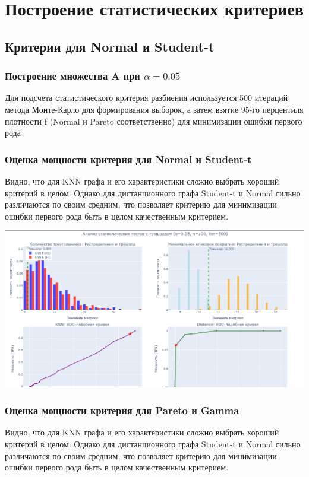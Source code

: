 \documentclass[a4paper,12pt]{report}
\begin{document}
\chapter{Построение статистических критериев}

\section{Критерии для Normal и Student-t}

\subsection{Построение множества A при $\alpha = 0.05$}

Для подсчета статистического критерия разбиения используется 500 итераций метода Монте-Карло для формирования выборок, а затем взятие 95-го перцентиля плотности f (Normal и Pareto соответственно) для минимизации ошибки первого рода

\subsection{Оценка мощности критерия для Normal и Student-t}

Видно, что для KNN графа и его характеристики сложно выбрать хороший критерий в целом. Однако для дистанционного графа Student-t и Normal сильно различаются по своим средним, что позволяет критерию для минимизации ошибки первого рода быть в целом качественным критерием.

\includegraphics[width=1\linewidth]{images/ilin_part3.png}
\subsection{Оценка мощности критерия для Pareto и Gamma}

Видно, что для KNN графа и его характеристики сложно выбрать хороший критерий в целом. Однако для дистанционного графа Student-t и Normal сильно различаются по своим средним, что позволяет критерию для минимизации ошибки первого рода быть в целом качественным критерием.
\end{document}
